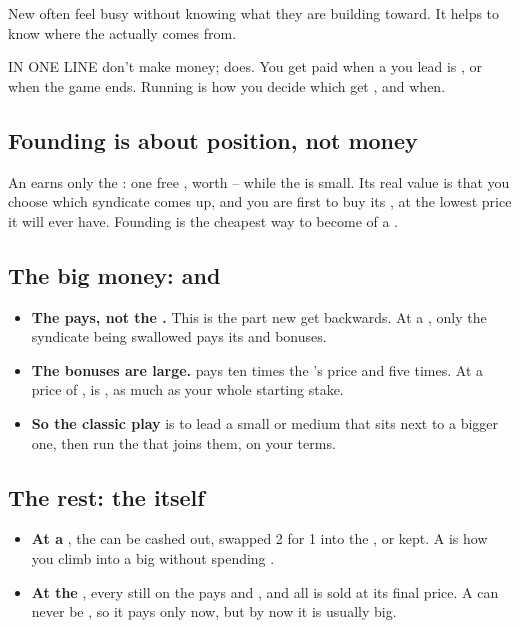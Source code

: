 New  often feel busy without knowing what they are building toward. It helps to know where the
 actually comes from.

\begin{note}{IN ONE LINE}
 don't make money;  does. You get paid when a  you lead is , or when the game ends.
Running  is how you decide which  get , and when.
\end{note}

\subsection{Founding is about position, not money}
An  earns only the : one free , worth -- while the  is small. Its real
value is that you choose which syndicate comes up, and you are first to buy its , at the lowest price it will ever have.
Founding is the cheapest way to become  of a .

\subsection{The big money:  and }
\begin{itemize}
  \item \textbf{The   pays, not the .} This is the part new  get backwards. At a ,
    only the syndicate being swallowed pays its  and  bonuses.
  \item \textbf{The bonuses are large.}  pays ten times the 's price and  five times. At a price of
    ,  is , as much as your whole starting stake.
  \item \textbf{So the classic play} is to lead a small or medium  that sits next to a bigger one, then run the 
    that joins them, on your terms.
\end{itemize}

\subsection{The rest: the  itself}
\begin{itemize}
  \item \textbf{At a }, the   can be cashed out, swapped 2 for 1 into the , or kept.
    A  is how you climb into a big  without spending .
  \item \textbf{At the }, every  still on the  pays  and , and all  is sold at its
    final price. A   can never be , so it pays only now, but by now it is usually big.
\end{itemize}


